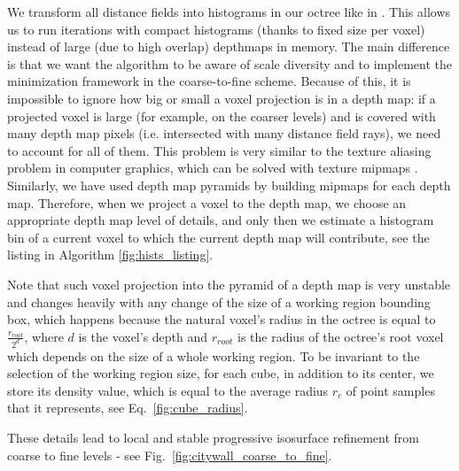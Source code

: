 \documentclass[10pt,twocolumn,letterpaper]{article}
\begin{document}
We transform all distance fields into histograms in our octree like in \cite{zach2007globally}. This allows us
to run iterations with compact histograms \cite{zach2008fast} (thanks to fixed size per voxel) instead of large (due to high overlap) depthmaps \cite{zach2007globally} in memory.
The main difference is that we want the algorithm to be aware of scale diversity and to implement the minimization framework in the coarse-to-fine scheme. Because of this, it is impossible to ignore how big or small a voxel projection is in a depth map: if a projected voxel is large (for example, on the coarser levels) and is covered with many depth map pixels (i.e. intersected with many distance field rays), we need to account for all of them. This problem is very similar to the texture aliasing problem in computer graphics, which can be solved
with texture mipmaps \cite{williams1983pyramidal}. Similarly, we have used depth map pyramids by building mipmaps for each depth map. Therefore, when we
project a voxel to the depth map, we choose an appropriate depth map level of details, and only then we estimate a histogram bin of a current voxel to which the current depth map will contribute,
see the listing in Algorithm \ref{fig:hists_listing}.

Note that such voxel projection into the pyramid of a depth map is very unstable and changes heavily with any change of the size of a working region bounding box, which happens because the natural voxel's radius in the octree is equal to $\frac{r_{root}}{2^{d}}$, where $d$ is the voxel's depth and $r_{root}$ is
the radius of the octree's root voxel which depends on the size of a whole working region. To be invariant to the selection of the working region size,
for each cube, in addition to its center, we store its density value, which is equal to the average radius $r_c$ of point samples that it represents, see Eq.~\ref{fig:cube_radius}.

These details lead to local and stable progressive isosurface refinement from coarse to fine levels - see Fig.~\ref{fig:citywall_coarse_to_fine}.
\end{document}
